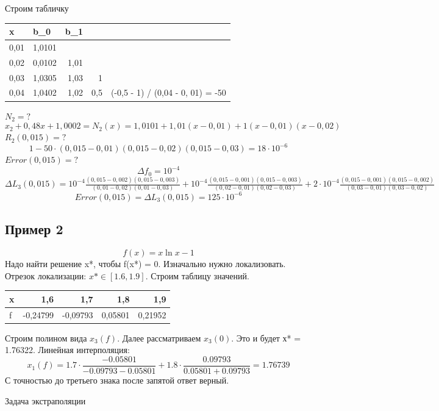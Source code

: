 \documentclass[a4paper,12pt]{article}
\newcommand\attention[1]{\colorbox{cyan!30}{#1}}
\begin{document}
Строим табличку
\begin{table}[h!]
\begin{tabular}{|r|r|r|l|l|}
\hline
\multicolumn{1}{|l|}{x} & \multicolumn{1}{l|}{b_0} & \multicolumn{1}{l|}{b_1} &                          &                                   \\ \hline
0,01                    & 1,0101                    & \multicolumn{1}{l|}{}     &                          &                                   \\ \hline
0,02                    & 0,0102                    & 1,01                      &                          &                                   \\ \hline
0,03                    & 1,0305                    & 1,03                      & \multicolumn{1}{r|}{1}   &                                   \\ \hline
0,04                    & 1,0402                    & 1,02                      & \multicolumn{1}{r|}{0,5} & (-0,5 - 1) / (0,04 - 0, 01) = -50 \\ \hline
\end{tabular}
\end{table}

$N_2 = ?$
\[x_2 + 0,48x + 1,0002 = N_2(x) = 1,0101 + 1,01(x-0,01) + 1(x-0,01)(x-0,02)\]
$R_2(0,015) = ?$
\[1 - 50 \cdot (0,015 - 0,01)(0,015 - 0,02)(0,015-0,03) = 18 \cdot 10^{-6}\]
$Error(0,015) = ?$
$$\Delta f_0 = 10^{-4}$$
$\Delta L_3(0,015) =  10^{-4}\frac{(0,015-0,002)(0,015-0,003)}{(0,01-0,02)(0,01-0,03)} + 10^{-4}\frac{(0,015-0,001)(0,015-0,003)}{(0,02-0,01)(0,02-0,03)} + 
2\cdot 10^{-4}\frac{(0,015-0,001)(0,015-0,002)}{(0,03-0,01)(0,03-0,02)}$
\[Error(0,015) = \Delta L_3(0,015) = 125 \cdot 10^{-6}\]

\subsection*{Пример 2}
\[f(x) = x \ln{x} - 1\]
Надо найти решение x*, чтобы f(x*) = 0.
Изначально нужно локализовать. Отрезок локализации: $x* \in [1.6, 1.9]$. Строим таблицу значений.
\begin{table}[h!]
\begin{tabular}{|l|r|r|r|r|}
\hline
x & 1,6      & 1,7      & 1,8    & 1,9     \\ \hline
f & -0,24799 & -0,09793 & 0,05801 & 0,21952 \\ \hline
\end{tabular}
\end{table}

Строим полином вида $x_3(f)$. Далее рассматриваем $x_3(0)$. Это и будет х* = 1.76322.
Линейная интерполяция: \\
\[x_1(f) = 1.7 \cdot \frac{-0.05801}{-0.09793-0.05801} + 1.8 \cdot \frac{0.09793}{0.05801 + 0.09793} = 1.76739\]
С точностью до третьего знака после запятой ответ верный.

\attention{Задача экстраполяции}
\end{document}
